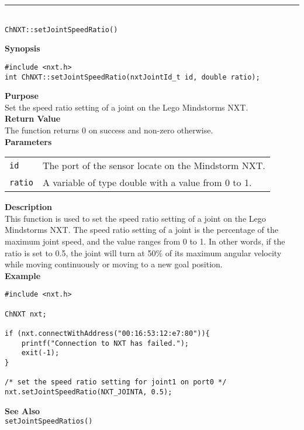\noindent
\vspace{5pt}
\rule{4.5in}{0.015in}\\
\noindent
{\LARGE \texttt{ChNXT::setJointSpeedRatio()} }\\


\noindent
{\bf Synopsis}
\begin{lstlisting}
#include <nxt.h>
int ChNXT::setJointSpeedRatio(nxtJointId_t id, double ratio);
\end{lstlisting}

\noindent
{\bf Purpose}\\
Set the speed ratio setting of a joint on the Lego Mindstorms NXT.\\

\noindent
{\bf Return Value}\\
The function returns 0 on success and non-zero otherwise.\\

\noindent
{\bf Parameters}\\
\vspace{-0.1in}
\begin{description}
\item
\begin{tabular}{ p{20mm}p{135mm} }
\texttt{id}&The port of the sensor locate on the Mindstorm NXT.\\
\texttt{ratio}&A variable of type double with a value from 0 to 1.\\
\end{tabular}
\end{description}

\noindent
{\bf Description}\\
This function is used to set the speed ratio setting of a joint on
the Lego Mindstorms NXT. The speed ratio setting of a joint is the
percentage of the maximum joint speed, and the value ranges from 
0 to 1. In other words, if the ratio is set to 0.5, the joint will
turn at 50\% of its maximum angular velocity while moving 
continuously or moving to a new goal position.\\

\noindent
{\bf Example}
\begin{lstlisting}
#include <nxt.h> 

ChNXT nxt;

if (nxt.connectWithAddress("00:16:53:12:e7:80")){
    printf("Connection to NXT has failed.");
    exit(-1);
}
    
/* set the speed ratio setting for joint1 on port0 */
nxt.setJointSpeedRatio(NXT_JOINTA, 0.5);
\end{lstlisting}
\noindent
{\bf See Also}\\
\texttt{setJointSpeedRatios()}\\
